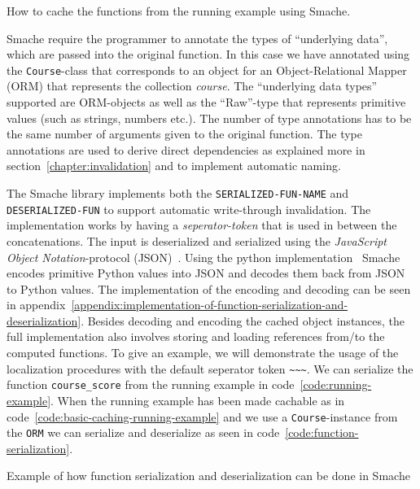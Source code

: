 \begin{code}{How to cache the functions from the running example using Smache.}
  
  \label{code:basic-caching-running-example}
\end{code}

Smache require the programmer to annotate the types of ``underlying data'', which are passed into the original function. In this case we have annotated using the \verb$Course$-class that corresponds to an object for an Object-Relational Mapper (ORM) that represents the collection \emph{course}. The ``underlying data types'' supported are ORM-objects as well as the ``Raw''-type that represents primitive values (such as strings, numbers etc.). The number of type annotations has to be the same number of arguments given to the original function. The type annotations are used to derive direct dependencies as explained more in section~\ref{chapter:invalidation} and to implement automatic naming.

The Smache library implements both the \verb$SERIALIZED-FUN-NAME$ and \verb$DESERIALIZED-FUN$ to support automatic write-through invalidation. The implementation works by having a \emph{seperator-token} that is used in between the concatenations. The input is deserialized and serialized using the \emph{JavaScript Object Notation}-protocol (JSON)~\cite{docs:json}. Using the python implementation~\cite{docs:python-json} Smache encodes primitive Python values into JSON and decodes them back from JSON to Python values. The implementation of the encoding and decoding can be seen in appendix~\ref{appendix:implementation-of-function-serialization-and-deserialization}. Besides decoding and encoding the cached object instances, the full implementation also involves storing and loading references from/to the computed functions.
To give an example, we will demonstrate the usage of the localization procedures with the default seperator token \verb$~~~$. We can serialize the function \verb$course_score$ from the running example in code~\ref{code:running-example}. When the running example has been made cachable as in code~\ref{code:basic-caching-running-example} and we use a \verb$Course$-instance from the \verb$ORM$ we can serialize and deserialize as seen in code~\ref{code:function-serialization}.

\begin{code}{Example of how function serialization and deserialization can be done in Smache}
  
  \label{code:function-serialization}
\end{code}

